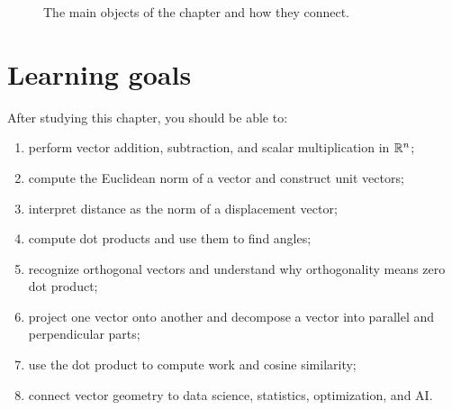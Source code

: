 \begin{figure}[H]
\centering
{}
\caption{The main objects of the chapter and how they connect.}
\end{figure}

\section*{Learning goals}

After studying this chapter, you should be able to:

\begin{enumerate}
\item perform vector addition, subtraction, and scalar multiplication in $\mathbb{R}^n$;
\item compute the Euclidean norm of a vector and construct unit vectors;
\item interpret distance as the norm of a displacement vector;
\item compute dot products and use them to find angles;
\item recognize orthogonal vectors and understand why orthogonality means zero dot product;
\item project one vector onto another and decompose a vector into parallel and perpendicular parts;
\item use the dot product to compute work and cosine similarity;
\item connect vector geometry to data science, statistics, optimization, and AI.
\end{enumerate}

